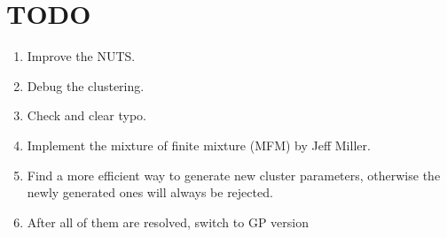 \documentclass[]{article}
\begin{document}
\clearpage


\section{TODO}
\begin{enumerate}
	\def\labelenumi{(\arabic{enumi})}
	\item
	Improve the NUTS.
	\item
	Debug the clustering.
	\item
	Check and clear typo.
	\item
	Implement the mixture of finite mixture (MFM) by Jeff Miller.
	\item
	Find a more efficient way to generate new cluster parameters, otherwise the newly generated ones will always be rejected.
	\item
	After all of them are resolved, switch to GP version
	
\end{enumerate}
\end{document}
